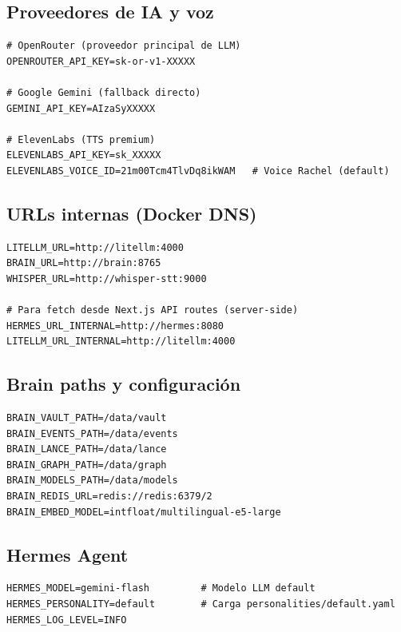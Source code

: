 \documentclass[11pt,a4paper]{article}
\begin{document}
\subsection{Proveedores de IA y voz}

\begin{lstlisting}[language=bashx]
# OpenRouter (proveedor principal de LLM)
OPENROUTER_API_KEY=sk-or-v1-XXXXX

# Google Gemini (fallback directo)
GEMINI_API_KEY=AIzaSyXXXXX

# ElevenLabs (TTS premium)
ELEVENLABS_API_KEY=sk_XXXXX
ELEVENLABS_VOICE_ID=21m00Tcm4TlvDq8ikWAM   # Voice Rachel (default)
\end{lstlisting}

\subsection{URLs internas (Docker DNS)}

\begin{lstlisting}[language=bashx]
LITELLM_URL=http://litellm:4000
BRAIN_URL=http://brain:8765
WHISPER_URL=http://whisper-stt:9000

# Para fetch desde Next.js API routes (server-side)
HERMES_URL_INTERNAL=http://hermes:8080
LITELLM_URL_INTERNAL=http://litellm:4000
\end{lstlisting}

\subsection{Brain paths y configuración}

\begin{lstlisting}[language=bashx]
BRAIN_VAULT_PATH=/data/vault
BRAIN_EVENTS_PATH=/data/events
BRAIN_LANCE_PATH=/data/lance
BRAIN_GRAPH_PATH=/data/graph
BRAIN_MODELS_PATH=/data/models
BRAIN_REDIS_URL=redis://redis:6379/2
BRAIN_EMBED_MODEL=intfloat/multilingual-e5-large
\end{lstlisting}

\subsection{Hermes Agent}

\begin{lstlisting}[language=bashx]
HERMES_MODEL=gemini-flash         # Modelo LLM default
HERMES_PERSONALITY=default        # Carga personalities/default.yaml
HERMES_LOG_LEVEL=INFO
\end{lstlisting}
\end{document}
